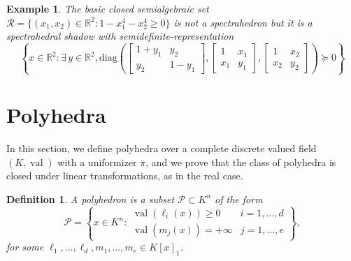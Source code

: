 \documentclass[sigconf]{acmart}
\newcommand{\R}{\mathbb{R}} %
\newcommand{\PP}{\mathcal{P}}
\newtheorem{definition}[theorem]{Definition}
\newtheorem{example}[theorem]{Example}
\DeclareMathOperator{\val}{val}
\def\diag{\mathrm{diag}}
\begin{document}
\begin{example}
\label{fermat_quartic}
The basic closed semialgebraic set $\mathcal{R} = \{(x_1,x_2) \in \R^2 : 1-x_1^4-x_2^4 \geq 0\}$ is not a spectrahedron but it is a spectrahedral shadow with semidefinite-representation
$$
\left\{x \in \R^2 :
\exists\, y \in \R^2,
\diag\left(
\left[
\begin{smallmatrix}
  1+y_1 & y_2 \\
  y_2 & 1-y_1
\end{smallmatrix}
\right],
\left[
\begin{smallmatrix}
  1 & x_1 \\
  x_1 & y_1
\end{smallmatrix}
\right],
\left[
\begin{smallmatrix}
  1 & x_2 \\
  x_2 & y_2
\end{smallmatrix}
\right]
\right)
\succeq 0
\right\}
$$
\end{example}


\section{Polyhedra}
\label{sec:polyhedra}

In this section, we define polyhedra over a complete discrete valued field $(K,\val)$
with a uniformizer $\pi$, and we prove that the class of polyhedra is closed under
linear transformations, as in the real case. 

\begin{definition}
  \label{def_polyhedra}
  A \emph{polyhedron} is a subset $\PP \subset K^n$ of the form
  \begin{equation}\label{eq_def_polyhedra}
  \PP =
  \left\{
  x \in K^n :
  \begin{array}{ll}
    \val(\ell_i(x)) \geq 0 & i=1,\ldots,d \\
    \val(m_j(x)) = +\infty & j=1,\ldots,e
  \end{array}
    \right\},
  \end{equation}
  for some $\ell_1,\ldots,\ell_d,m_1,\ldots,m_e \in K[x]_1$.
\end{definition}
\end{document}
